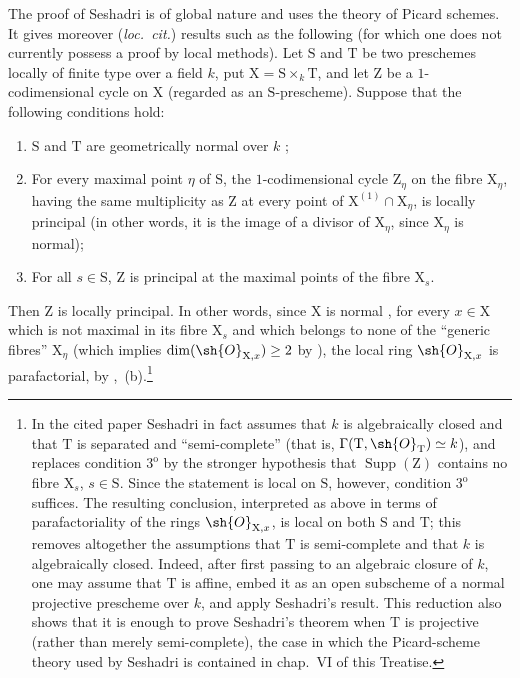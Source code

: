 \begin{env}[21.14.4]
The proof of Seshadri \cite[pp.~188--189]{IV-44} is of global nature and uses the theory of Picard schemes.
It gives moreover (\emph{loc.\ cit.}) results such as the following (for which one does not currently possess a proof by local methods).
Let $\mathrm{S}$ and $\mathrm{T}$ be two preschemes locally of finite type over a field $k$, put $\mathrm{X}=\mathrm{S}\times_k\mathrm{T}$, and let $\mathrm{Z}$ be a $1$-codimensional cycle on $\mathrm{X}$ (regarded as an $\mathrm{S}$-prescheme). Suppose that the following conditions hold:
\begin{enumerate}[label=\arabic*\textsuperscript{o}]
  \item $\mathrm{S}$ and $\mathrm{T}$ are geometrically normal over $k$ ;
  \item For every maximal point $\eta$ of $\mathrm{S}$, the $1$-codimensional cycle $\mathrm{Z}_\eta$ on the fibre $\mathrm{X}_\eta$, having the same multiplicity as $\mathrm{Z}$ at every point of $\mathrm{X}^{(1)}\cap\mathrm{X}_\eta$, is locally principal (in other words, it is the image of a divisor of $\mathrm{X}_\eta$, since $\mathrm{X}_\eta$ is normal);
  \item For all $s\in\mathrm{S}$, $\mathrm{Z}$ is principal at the maximal points of the fibre $\mathrm{X}_s$.
\end{enumerate}
Then $\mathrm{Z}$ is locally principal.
In other words, since $\mathrm{X}$ is normal , for every $x\in\mathrm{X}$ which is not maximal in its fibre $\mathrm{X}_s$ and which belongs to none of the ``generic fibres'' $\mathrm{X}_\eta$ (which implies $\dim(\sh{O}_{\mathrm{X},x})\geq2$ by ), the local ring $\sh{O}_{\mathrm{X},x}$ is parafactorial, by ,~(b).\footnote{In the cited paper Seshadri in fact assumes that $k$ is algebraically closed and that $\mathrm{T}$ is separated and ``semi-complete'' (that is, $\Gamma(\mathrm{T},\sh{O}_{\mathrm{T}})\simeq k$), and replaces condition $3^{\mathrm{o}}$ by the stronger hypothesis that $\operatorname{Supp}(\mathrm{Z})$ contains no fibre $\mathrm{X}_s$, $s\in\mathrm{S}$. Since the statement is local on $\mathrm{S}$, however, condition $3^{\mathrm{o}}$ suffices. The resulting conclusion, interpreted as above in terms of parafactoriality of the rings $\sh{O}_{\mathrm{X},x}$, is local on both $\mathrm{S}$ and $\mathrm{T}$; this removes altogether the assumptions that $\mathrm{T}$ is semi-complete and that $k$ is algebraically closed. Indeed, after first passing to an algebraic closure of $k$, one may assume that $\mathrm{T}$ is affine, embed it as an open subscheme of a normal projective prescheme over $k$, and apply Seshadri's result. This reduction also shows that it is enough to prove Seshadri's theorem when $\mathrm{T}$ is projective (rather than merely semi-complete), the case in which the Picard-scheme theory used by Seshadri is contained in chap.~VI of this Treatise.}
\end{env}

